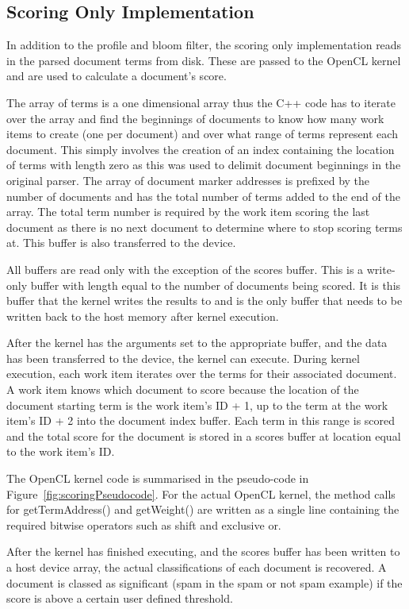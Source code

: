 \subsection{Scoring Only Implementation}

In addition to the profile and bloom filter, the scoring only implementation
reads in the parsed document terms from disk. These are passed to the OpenCL
kernel and are used to calculate a document's score.

The array of terms is a one dimensional array thus the C++ code has to iterate
over the array and find the beginnings of documents to know how many work items
to create (one per document) and over what range of terms represent each
document. This simply involves the creation of an index containing the location
of terms with length zero as this was used to delimit document beginnings in the
original parser. The array of document marker addresses is prefixed by the
number of documents and has the total number of terms added to the end of the
array. The total term number is required by the work item scoring the last
document as there is no next document to determine where to stop scoring terms
at. This buffer is also transferred to the device.

All buffers are read only with the exception of the scores buffer. This is a
write-only buffer with length equal to the number of documents being scored. It
is this buffer that the kernel writes the results to and is the only buffer that
needs to be written back to the host memory after kernel execution.

After the kernel has the arguments set to the appropriate buffer, and the data
has been transferred to the device, the kernel can execute. During kernel
execution, each work item iterates over the terms for their associated document.
A work item knows which document to score because the location of the document
starting term is the work item's ID + 1, up to the term at the work item's ID +
2 into the document index buffer. Each term in this range is scored and the
total score for the document is stored in a scores buffer at location equal to
the work item's ID.

The OpenCL kernel code is summarised in the pseudo-code in
Figure~\ref{fig:scoringPseudocode}. For the actual OpenCL kernel, the method
calls for getTermAddress() and getWeight() are written as a single line
containing the required bitwise operators such as shift and exclusive or.

After the kernel has finished executing, and the scores buffer has been written
to a host device array, the actual classifications of each document is
recovered. A document is classed as significant (spam in the spam or not spam
example) if the score is above a certain user defined threshold.

